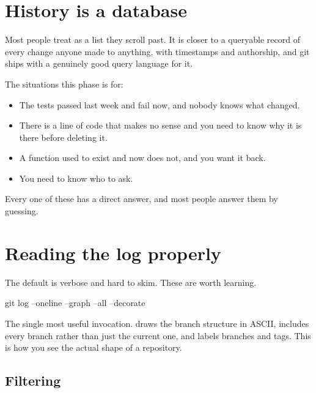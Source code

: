 \documentclass[11pt]{article}
\begin{document}
\maketitlepage

\section{History is a database}

Most people treat  as a list they scroll past. It is closer to a
queryable record of every change anyone made to anything, with timestamps and
authorship, and git ships with a genuinely good query language for it.

The situations this phase is for:

\begin{itemize}
  \item The tests passed last week and fail now, and nobody knows what changed.
  \item There is a line of code that makes no sense and you need to know why it is
    there before deleting it.
  \item A function used to exist and now does not, and you want it back.
  \item You need to know who to ask.
\end{itemize}

Every one of these has a direct answer, and most people answer them by guessing.

\section{Reading the log properly}

The default  is verbose and hard to skim. These are worth learning.

\begin{shell}
git log --oneline --graph --all --decorate
\end{shell}

The single most useful invocation.  draws the branch structure in ASCII,
 includes every branch rather than just the current one, and
 labels branches and tags. This is how you see the actual shape of a
repository.

\subsection{Filtering}
\end{document}

